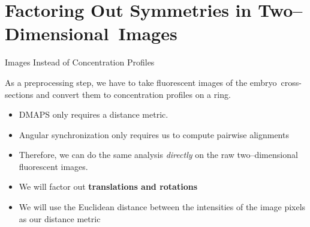 \section[Factoring Out Symmetries in Two--Dimensional~Images]{Factoring Out Symmetries in Two--Dimensional~Images}

\begin{frame}{Images Instead of Concentration Profiles}
	
	\centering
    As a preprocessing step, we have to take fluorescent images of the embryo~cross-sections and convert them to concentration profiles on a ring.
    
    \centering
    
    \begin{itemize}
    	\item DMAPS only requires a distance metric.
    	\item Angular synchronization only requires us to compute pairwise alignments
    	\item Therefore, we can do the same analysis {\em directly} on the raw two--dimensional fluorescent images.
    	\item We will factor out {\bf translations and rotations} 
    	\item We will use the Euclidean distance between the intensities of the image pixels as our distance metric
    \end{itemize}
    
	\end{frame}

